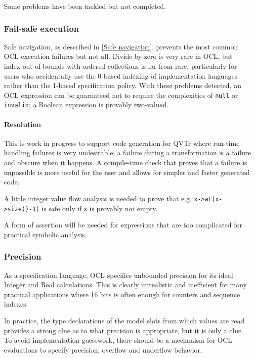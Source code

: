 \documentclass{jot}
\begin{document}
Some problems have been tackled but not completed.

\subsubsection{Fail-safe execution}\label{Fail-Safe OCL}

Safe navigation, as described in \ref{Safe navigation}, prevents the most common OCL execution failures but not all. Divide-by-zero is very rare in OCL, but index-out-of-bounds with ordered collections is far from rare, particularly for users who accidentally use the 0-based indexing of implementation languages rather than the 1-based specification policy. With these problems detected, an OCL expression can be guaranteed not to require the complexities of \verb$null$ or \verb$invalid$; a Boolean expression is provably two-valued.  

\paragraph{Resolution} This is work in progress to support code generation for QVTr where run-time handling failures is very undesirable; a failure during a transformation is a failure and obscure when it happens. A compile-time check that proves that a failure is impossible is more useful for the user and allows for simpler and faster generated code.

A little integer value flow analysis is needed to prove that e.g. \verb$x->at(x->size()-1)$ is safe only if \verb$x$ is provably not empty.

A form of assertion will be needed for expressions that are too complicated for practical symbolic analysis.

\subsubsection{Precision}

As a specification language, OCL specifies unbounded precision for its ideal Integer and Real calculations. This is clearly unrealistic and inefficient for many practical applications where 16 bits is often enough for counters and sequence indexes.

In practice, the type declarations of the model slots from which values are read provides a strong clue as to what precision is appropriate, but it is only a clue. To avoid implementation guesswork, there should be a mechanism for OCL evaluations to specify precision, overflow and underflow behavior.
\end{document}
